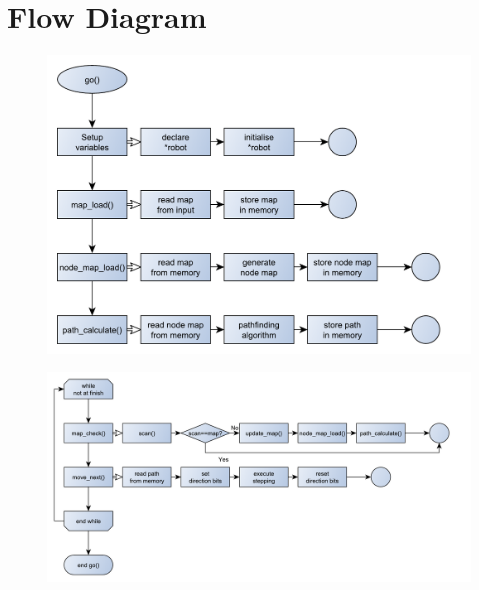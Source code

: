 \chapter{Flow Diagram}
\label{app:flow}

\begin{figure}[h!]
    \centering
    \includegraphics[height=0.8\textwidth,angle=90]{figures/app_general/flowchart1}
\end{figure}
\begin{figure}[h!]
    \centering
    \includegraphics[height=0.8\textwidth,angle=90]{figures/app_general/flowchart2}
\end{figure}